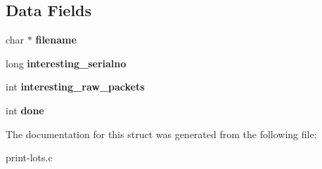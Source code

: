 \subsection*{Data Fields}
\begin{CompactItemize}
\item 
char $\ast$ {\bf filename}\label{structmy__data_o0}

\item 
long {\bf interesting\_\-serialno}\label{structmy__data_o1}

\item 
int {\bf interesting\_\-raw\_\-packets}\label{structmy__data_o2}

\item 
int {\bf done}\label{structmy__data_o3}

\end{CompactItemize}


The documentation for this struct was generated from the following file:\begin{CompactItemize}
\item 
print-lots.c\end{CompactItemize}
